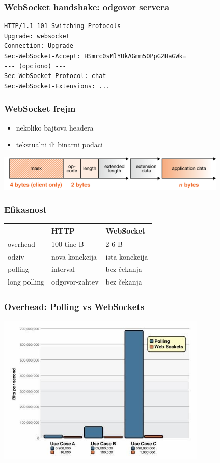\documentclass[compress]{beamer}
\begin{document}
\begin{frame}[fragile]
  \frametitle{WebSocket handshake: odgovor servera}
\begin{verbatim}
HTTP/1.1 101 Switching Protocols
Upgrade: websocket
Connection: Upgrade
Sec-WebSocket-Accept: HSmrc0sMlYUkAGmm5OPpG2HaGWk=
--- (opciono) ---
Sec-WebSocket-Protocol: chat
Sec-WebSocket-Extensions: ...
\end{verbatim}
\end{frame}

\begin{frame}
  \frametitle{WebSocket frejm}
  \begin{itemize}
    \item nekoliko bajtova headera
    \item tekstualni ili binarni podaci
  \end{itemize}
\begin{center}
  \includegraphics[width=11cm]{WebSocketFrame.png}
\end{center}
\end{frame}

\begin{frame}
  \frametitle{Efikasnost}
\begin{center}
\begin{tabular}{l|l|l}
 & HTTP & WebSocket \\ \hline \hline
overhead & 100-tine B & 2-6 B \\ \hline
odziv & nova konekcija & ista konekcija \\ \hline
polling & interval & bez čekanja \\ \hline
long polling & odgovor-zahtev & bez čekanja
\end{tabular}
\end{center}
\end{frame}

\begin{frame}
\frametitle{Overhead: Polling vs WebSockets}
\begin{center}
  \includegraphics[width=10cm]{comparison.jpg}
\end{center}
\end{frame}
\end{document}
